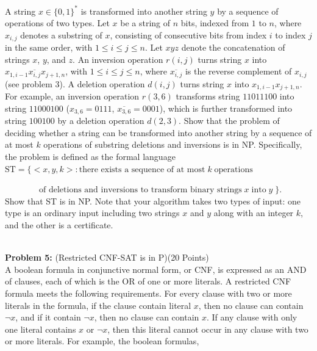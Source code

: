 \documentclass[11pt]{amsart}
\begin{document}
A string $x \in \{ 0, 1 \}^*$ is transformed into another string $y$ by a sequence of operations of two types. Let $x$ be a string of $n$ bits, indexed from $1$ to $n$, where $x_{i,j}$ denotes a substring of $x$, consisting of consecutive bits from index $i$ to index $j$ in the same order, with $1 \leq i \leq j \leq n$. Let $xyz$ denote the concatenation of strings $x$, $y$, and $z$. An inversion operation $r(i,j)$ turns string $x$ into $x_{1, i-1} \overline{x_{i, j}} x_{j+1, n}$, with $1 \leq i \leq j \leq n$, where $\overline{x_{i, j}}$ is the reverse complement of $x_{i, j}$ (see problem 3). A deletion operation $d(i,j)$ turns string $x$ into $x_{1, i-1} x_{j+1, n}$. For example, an inversion operation $r(3, 6)$ transforms string $11011100$ into string $11000100$ ($x_{3, 6} = 0111$, $\overline{x_{3, 6}} = 0001$), which is further transformed into string $100100$ by a deletion operation $d(2, 3)$.
Show that the problem of deciding whether a string can be
transformed into another string by a sequence of at most $k$ operations of
substring deletions and inversions is in NP. Specifically, the problem is defined
as the formal language \\

$\textrm{ST} = \{ <x, y, k>: \textrm{there exists a sequence of at most}\; k \; \textrm{operations}$

$\qquad \qquad \textrm{of deletions and inversions to transform binary strings}\; x\; \textrm{into}\; y\; \}$. \\

Show that ST is in NP. Note that your algorithm takes two types of input: one type is an ordinary input including two strings $x$ and $y$ along with an integer $k$, and the other is a certificate.

\newpage
\hrulefill \\
\textbf{Problem 5:} (Restricted CNF-SAT is in P)\hfill (20 Points)\\

A boolean formula in conjunctive normal form, or CNF, is expressed as an AND of clauses, each of which is the OR of one or more literals. A restricted CNF formula meets the following requirements. For every clause with two or more literals in the formula, if the clause contain literal $x$, then no clause can contain $\neg x$, and if it contain $\neg x$, then no clause can contain $x$. If any clause with only one literal contains $x$ or $\neg x$, then this literal cannot occur in any clause with two or more literals. For example, the boolean formulas, \\
\end{document}
